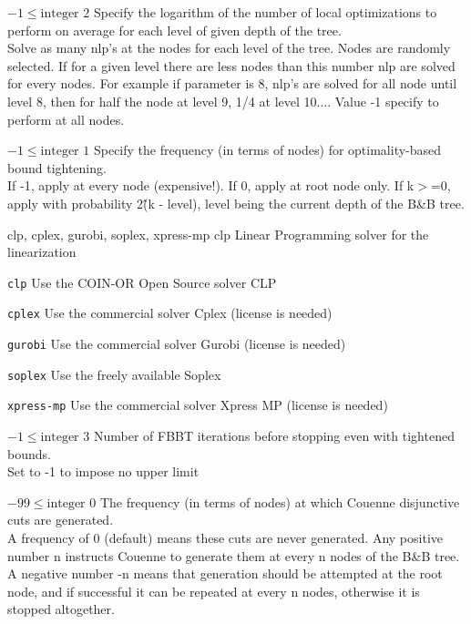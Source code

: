 %
{$-1\leq\textrm{integer}$}%
{$2$}%
{Specify the logarithm of the number of local optimizations to perform on average for each level of given depth of the tree.\\
Solve as many nlp's at the nodes for each level of the tree. Nodes are randomly selected. If for a given level there are less nodes than this number nlp are solved for every nodes. For example if parameter is 8, nlp's are solved for all node until level 8, then for half the node at level 9, 1/4 at level 10.... Value -1 specify to perform at all nodes.}%
{}

%
{$-1\leq\textrm{integer}$}%
{$1$}%
{Specify the frequency (in terms of nodes) for optimality-based bound tightening.\\
If -1, apply at every node (expensive!). If 0, apply at root node only. If k$>$=0, apply with probability 2\^(k - level), level being the current depth of the B\&B tree.}%
{}

%
{\ttfamily clp, cplex, gurobi, soplex, xpress-mp}%
{clp}%
{Linear Programming solver for the linearization}%
{\begin{list}{}{
\setlength{\parsep}{0em}
\setlength{\leftmargin}{5ex}
\setlength{\labelwidth}{2ex}
\setlength{\itemindent}{0ex}
\setlength{\topsep}{0pt}}
\item[\texttt{clp}] Use the COIN-OR Open Source solver CLP
\item[\texttt{cplex}] Use the commercial solver Cplex (license is needed)
\item[\texttt{gurobi}] Use the commercial solver Gurobi (license is needed)
\item[\texttt{soplex}] Use the freely available Soplex
\item[\texttt{xpress-mp}] Use the commercial solver Xpress MP (license is needed)
\end{list}
}

%
{$-1\leq\textrm{integer}$}%
{$3$}%
{Number of FBBT iterations before stopping even with tightened bounds.\\
Set to -1 to impose no upper limit}%
{}

%
{$-99\leq\textrm{integer}$}%
{$0$}%
{The frequency (in terms of nodes) at which Couenne disjunctive cuts are generated.\\
A frequency of 0 (default) means these cuts are never generated. Any positive number n instructs Couenne to generate them at every n nodes of the B\&B tree. A negative number -n means that generation should be attempted at the root node, and if successful it can be repeated at every n nodes, otherwise it is stopped altogether.}%
{}

